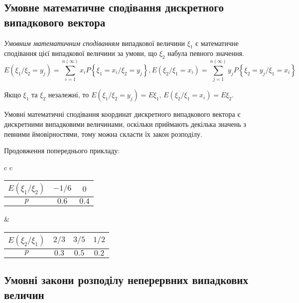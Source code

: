 \subsection{Умовне математичне сподівання дискретного випадкового вектора}
\begin{definition}
    \emph{Умовним математичним сподіванням} випадкової величини $\xi_1$ 
    є математичне сподівання цієї випадкової величини за умови, що 
    $\xi_2$ набула певного значення.
    $$E(\xi_1 / \xi_2 = y_j) =
\sum\limits_{i=1}^{n(\infty)}x_i 
P\left\{\xi_1 = x_i / \xi_2 = y_j\right\}, 
E(\xi_2 / \xi_1 = x_i) = \sum\limits_{j=1}^{n(\infty)}y_j 
P\left\{\xi_2 = y_j / \xi_1 = x_i\right\}$$
\end{definition}

\begin{remark}
    Якщо $\xi_1$ та $\xi_2$ незалежні, то $E(\xi_1 / \xi_2 = y_j) 
    = E\xi_1$, $E(\xi_2 / \xi_1 = x_i) = E\xi_2$.
\end{remark}

Умовні математичні сподівання координат дискретного випадкового вектора є дискретними випадковими величинами, оскільки 
приймають декілька значень з певними ймовірностями, тому можна скласти 
їх закон розподілу.
\begin{example}
    Продовження попереднього прикладу:

    \begin{tabular}{c c}
        \begin{tabular}{|c|c|c|}
            \hline
            $E(\xi_1 / \xi_2)$ & $-1/6$ & $0$ \\
            \hline
            $p$ & $0.6$ & $0.4$ \\
            \hline
        \end{tabular}
        &
        \begin{tabular}{|c|c|c|c|}
            \hline
            $E(\xi_2 / \xi_1)$ & $2/3$ & $3/5$ & $1/2$ \\
            \hline
            $p$ & $0.3$ & $0.5$ & $0.2$ \\
            \hline
        \end{tabular}
    \end{tabular}
\end{example}

\subsection{Умовні закони розподілу неперервних випадкових величин}

